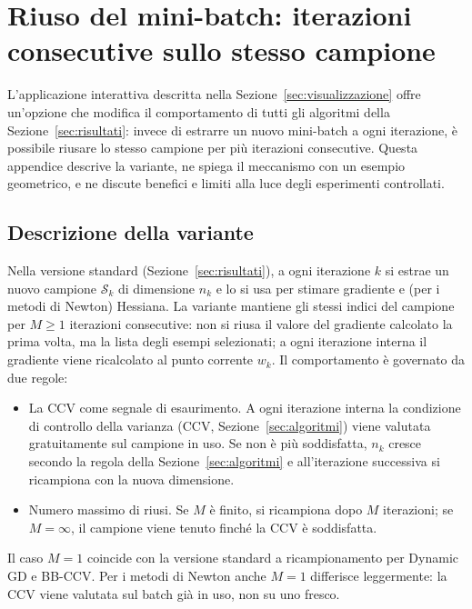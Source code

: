 \section{Riuso del mini-batch: iterazioni consecutive sullo stesso campione}\label{app:riuso}

L'applicazione interattiva descritta nella Sezione~\ref{sec:visualizzazione} offre
un'opzione che modifica il comportamento di tutti gli algoritmi della
Sezione~\ref{sec:risultati}: invece di estrarre un nuovo mini-batch a ogni
iterazione, è possibile riusare lo stesso campione per più iterazioni
consecutive. Questa appendice descrive la variante, ne spiega il meccanismo
con un esempio geometrico, e ne discute benefici e limiti alla luce degli
esperimenti controllati.

\subsection{Descrizione della variante}\label{app:riuso-descrizione}

Nella versione standard (Sezione~\ref{sec:risultati}), a ogni iterazione $k$
si estrae un nuovo campione $\mathcal{S}_k$ di dimensione $n_k$ e lo si usa
per stimare gradiente e (per i metodi di Newton) Hessiana. La variante
mantiene gli stessi indici del campione per $M \ge 1$ iterazioni
consecutive: non si riusa il valore del gradiente calcolato la prima volta,
ma la lista degli esempi selezionati; a ogni iterazione interna il gradiente
viene ricalcolato al punto corrente $w_k$. Il comportamento è governato da
due regole:

\begin{itemize}
\item La CCV come segnale di esaurimento. A ogni iterazione interna
  la condizione di controllo della varianza (CCV, Sezione~\ref{sec:algoritmi})
  viene valutata gratuitamente sul campione in uso. Se non è più
  soddisfatta, $n_k$ cresce secondo la regola della Sezione~\ref{sec:algoritmi}
  e all'iterazione successiva si ricampiona con la nuova dimensione.
\item Numero massimo di riusi. Se $M$ è finito, si ricampiona dopo
  $M$ iterazioni; se $M = \infty$, il campione viene tenuto finché la CCV è
  soddisfatta.
\end{itemize}

Il caso $M = 1$ coincide con la versione standard a ricampionamento per
Dynamic GD e BB-CCV. Per i metodi di Newton anche $M = 1$ differisce
leggermente: la CCV viene valutata sul batch già in uso, non su uno fresco.

